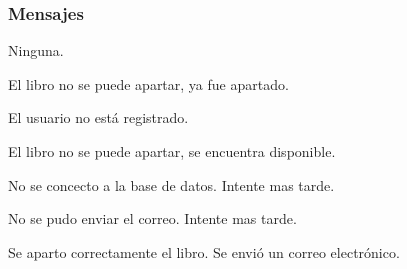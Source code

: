 \subsubsection{Mensajes}
	\begin{Citemize}
		\item Ninguna.
		\item El libro no se puede apartar, ya fue apartado.
		\item El usuario no está registrado.
		\item El libro no se puede apartar, se encuentra disponible.
		\item No se concecto a la base de datos. Intente mas tarde.
		\item No se pudo enviar el correo. Intente mas tarde.
		\item Se aparto correctamente el libro. Se envió un correo electrónico.
	\end{Citemize}